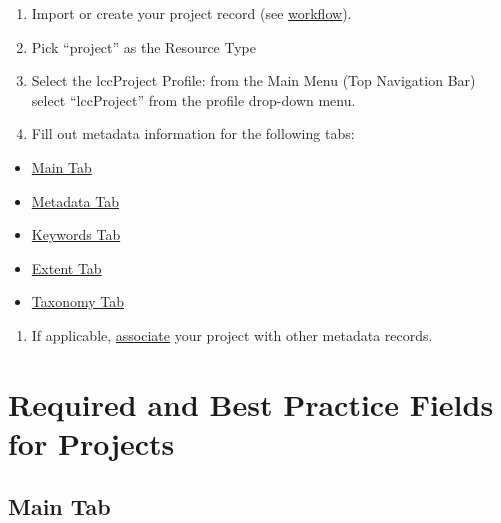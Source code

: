 \documentclass[
]{book}
\providecommand{\tightlist}{%
  \setlength{\itemsep}{0pt}\setlength{\parskip}{0pt}}
\begin{document}
\begin{enumerate}
\def\labelenumi{\arabic{enumi}.}
\tightlist
\item
  Import or create your project record (see \protect\hyperlink{workflow}{workflow}).
\item
  Pick ``project'' as the Resource Type
\item
  Select the lccProject Profile: from the Main Menu (Top Navigation Bar) select ``lccProject'' from the profile drop-down menu.
\item
  Fill out metadata information for the following tabs:
\end{enumerate}

\begin{itemize}
\tightlist
\item
  \protect\hyperlink{project-main}{Main Tab}
\item
  \protect\hyperlink{project-metadata}{Metadata Tab}
\item
  \protect\hyperlink{project-keywords}{Keywords Tab}
\item
  \protect\hyperlink{project-extent}{Extent Tab}
\item
  \protect\hyperlink{project-taxonomy}{Taxonomy Tab}
\end{itemize}

\begin{enumerate}
\def\labelenumi{\arabic{enumi}.}
\setcounter{enumi}{4}
\tightlist
\item
  If applicable, \protect\hyperlink{project-associations}{associate} your project with other metadata records.
\end{enumerate}

\hypertarget{required-and-best-practice-fields-for-projects}{%
\section*{Required and Best Practice Fields for Projects}\label{required-and-best-practice-fields-for-projects}}

\hypertarget{main-tab-1}{%
\subsection*{Main Tab}\label{main-tab-1}}
\end{document}
